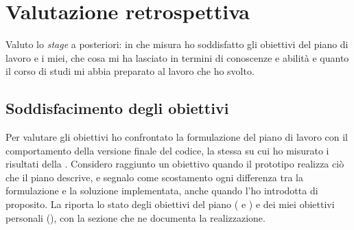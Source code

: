 
\chapter{Valutazione retrospettiva}

Valuto lo \emph{stage} a posteriori: in che misura ho soddisfatto gli obiettivi del piano di lavoro
e i miei, che cosa mi ha lasciato in termini di conoscenze e abilità e quanto il corso di studi mi
abbia preparato al lavoro che ho svolto.

\section{Soddisfacimento degli obiettivi}
\label{sec:soddisfacimento}

Per valutare gli obiettivi ho confrontato la formulazione del piano di lavoro con il comportamento
della versione finale del codice, la stessa su cui ho misurato i risultati della
. Considero raggiunto un obiettivo quando il prototipo realizza ciò che il
piano descrive, e segnalo come scostamento ogni differenza tra la formulazione e la soluzione
implementata, anche quando l’ho introdotta di proposito. La  riporta lo
stato degli obiettivi del piano ( e ) e dei miei
obiettivi personali (), con la sezione che ne documenta la realizzazione.


